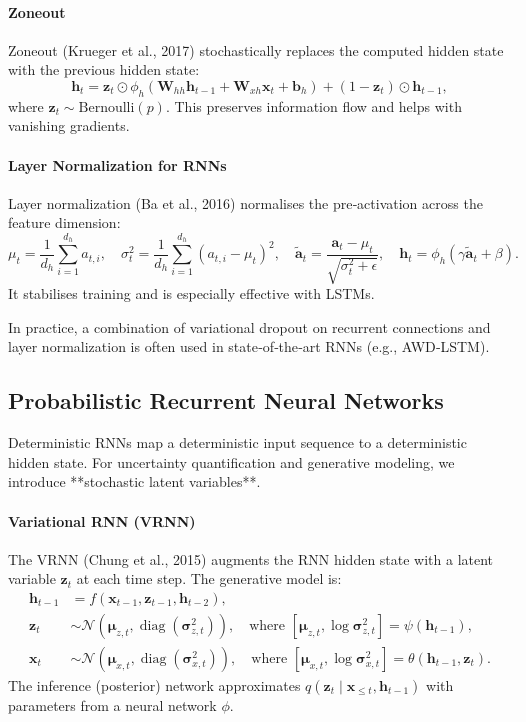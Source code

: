 \documentclass{tufte-handout}
\begin{document}
\paragraph{Zoneout}
Zoneout (Krueger et al., 2017) stochastically replaces the computed hidden state with the previous hidden state:
\[
\mathbf{h}_t = \mathbf{z}_t \odot \phi_h(\mathbf{W}_{hh}\mathbf{h}_{t-1} + \mathbf{W}_{xh}\mathbf{x}_t + \mathbf{b}_h) + (1 - \mathbf{z}_t) \odot \mathbf{h}_{t-1},
\]
where $\mathbf{z}_t \sim \text{Bernoulli}(p)$. This preserves information flow and helps with vanishing gradients.

\paragraph{Layer Normalization for RNNs}
Layer normalization (Ba et al., 2016) normalises the pre‑activation across the feature dimension:
\[
\mu_t = \frac{1}{d_h}\sum_{i=1}^{d_h} a_{t,i},\quad \sigma_t^2 = \frac{1}{d_h}\sum_{i=1}^{d_h} (a_{t,i} - \mu_t)^2,\quad \tilde{\mathbf{a}}_t = \frac{\mathbf{a}_t - \mu_t}{\sqrt{\sigma_t^2 + \epsilon}},\quad \mathbf{h}_t = \phi_h(\gamma \tilde{\mathbf{a}}_t + \beta).
\]
It stabilises training and is especially effective with LSTMs.

\begin{remark}
    In practice, a combination of variational dropout on recurrent connections and layer normalization is often used in state‑of‑the‑art RNNs (e.g., AWD‑LSTM).
\end{remark}

\subsection{Probabilistic Recurrent Neural Networks}

Deterministic RNNs map a deterministic input sequence to a deterministic hidden state. For uncertainty quantification and generative modeling, we introduce **stochastic latent variables**.

\paragraph{Variational RNN (VRNN)}
The VRNN (Chung et al., 2015) augments the RNN hidden state with a latent variable $\mathbf{z}_t$ at each time step. The generative model is:
\begin{align}
    \mathbf{h}_{t-1} &= f(\mathbf{x}_{t-1}, \mathbf{z}_{t-1}, \mathbf{h}_{t-2}), \\
    \mathbf{z}_t &\sim \mathcal{N}(\boldsymbol{\mu}_{z,t}, \operatorname{diag}(\boldsymbol{\sigma}_{z,t}^2)), \quad \text{where } [\boldsymbol{\mu}_{z,t}, \log \boldsymbol{\sigma}_{z,t}^2] = \psi(\mathbf{h}_{t-1}), \\
    \mathbf{x}_t &\sim \mathcal{N}(\boldsymbol{\mu}_{x,t}, \operatorname{diag}(\boldsymbol{\sigma}_{x,t}^2)), \quad \text{where } [\boldsymbol{\mu}_{x,t}, \log \boldsymbol{\sigma}_{x,t}^2] = \theta(\mathbf{h}_{t-1}, \mathbf{z}_t).
\end{align}
The inference (posterior) network approximates $q(\mathbf{z}_t \mid \mathbf{x}_{\le t}, \mathbf{h}_{t-1})$ with parameters from a neural network $\phi$.
\end{document}

